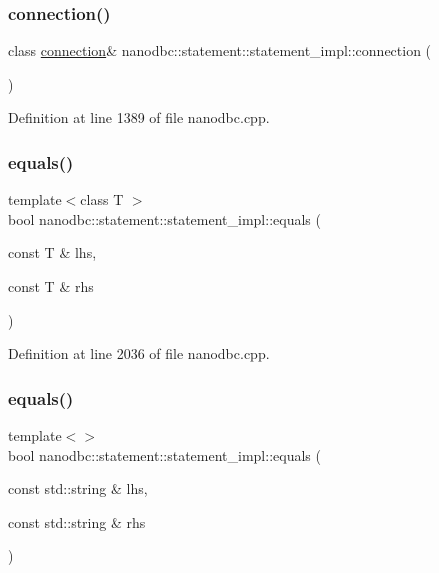 \subsubsection{\texorpdfstring{connection()}{connection()}\hspace{0.1cm}{\footnotesize\ttfamily [2/2]}}
{\footnotesize\ttfamily class \mbox{\hyperlink{classnanodbc_1_1connection}{connection}}\& nanodbc\+::statement\+::statement\+\_\+impl\+::connection (\begin{DoxyParamCaption}{ }\end{DoxyParamCaption})\hspace{0.3cm}{\ttfamily [inline]}}



Definition at line 1389 of file nanodbc.\+cpp.

\mbox{\label{classnanodbc_1_1statement_1_1statement__impl_a5005c8f34878233ef86f68a3cd291840}} 
\subsubsection{\texorpdfstring{equals()}{equals()}\hspace{0.1cm}{\footnotesize\ttfamily [1/6]}}
{\footnotesize\ttfamily template$<$class T $>$ \\
bool nanodbc\+::statement\+::statement\+\_\+impl\+::equals (\begin{DoxyParamCaption}\item[{const T \&}]{lhs,  }\item[{const T \&}]{rhs }\end{DoxyParamCaption})\hspace{0.3cm}{\ttfamily [inline]}}



Definition at line 2036 of file nanodbc.\+cpp.

\mbox{\label{classnanodbc_1_1statement_1_1statement__impl_a34a21f43a3841249a9d4f2a6930fda3c}} 
\subsubsection{\texorpdfstring{equals()}{equals()}\hspace{0.1cm}{\footnotesize\ttfamily [2/6]}}
{\footnotesize\ttfamily template$<$$>$ \\
bool nanodbc\+::statement\+::statement\+\_\+impl\+::equals (\begin{DoxyParamCaption}\item[{const std\+::string \&}]{lhs,  }\item[{const std\+::string \&}]{rhs }\end{DoxyParamCaption})}



